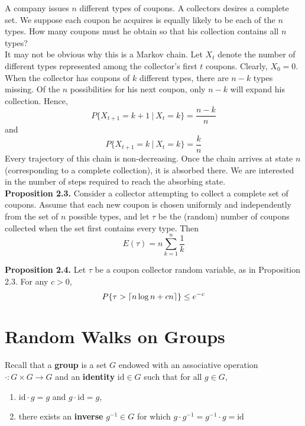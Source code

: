 \documentclass[12pt]{article}
\DeclarePairedDelimiter{\ceil}{\lceil}{\rceil}
\begin{document}
A company issues $n$ different types of coupons. A collectors desires a complete set. We suppose each coupon he acquires is equally likely to be each of the $n$ types. How many coupons must he obtain so that his collection contains all $n$ types?\\

It may not be obvious why this is a Markov chain. Let $X_t$ denote the number of different types represented among the collector's first $t$ coupons. Clearly, $X_0 = 0$. When the collector has coupons of $k$ different types, there are $n-k$ types missing. Of the $n$ possibilities for his next coupon, only $n-k$ will expand his collection. Hence, $$P\{X_{t+1} = k + 1 \ | \ X_t = k\} = \frac{n-k}{n}$$ and $$P\{X_{t+1} = k \ | \ X_t = k\} = \frac{k}{n}$$ Every trajectory of this chain is non-decreasing. Once the chain arrives at state $n$ (corresponding to a complete collection), it is absorbed there. We are interested in the number of steps required to reach the absorbing state.\\

\textbf{Proposition 2.3.} Consider a collector attempting to collect a complete set of coupons. Assume that each new coupon is chosen uniformly and independently from the set of $n$ possible types, and let $\tau$ be the (random) number of coupons collected when the set first contains every type. Then $$E(\tau) = n \sum_{k=1}^n \frac{1}{k}$$

\textbf{Proposition 2.4.} Let $\tau$ be a coupon collector random variable, as in Proposition 2.3. For any $c > 0$, $$P\{\tau > \ceil{n\log n + cn}\} \leq e^{-c}$$


\section{Random Walks on Groups}

Recall that a \textbf{group} is a set $G$ endowed with an associative operation $\cdot : G \times G \to G$ and an \textbf{identity} $\text{id} \in G$ such that for all $g \in G$,
\begin{enumerate}
\item $\text{id} \cdot g = g$ and $g \cdot \text{id} = g$,
\item there exists an \textbf{inverse} $g^{-1} \in G$ for which $g \cdot g^{-1} = g^{-1} \cdot g = \text{id}$
\end{enumerate}
\end{document}
